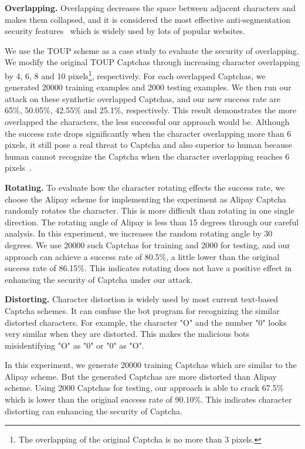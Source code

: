\textbf{Overlapping.} Overlapping decreases the space between adjacent characters and makes them collapsed, and it is considered the most effective anti-segmentation security features~\cite{Bursztein2011Text} which is widely used by lots of popular websites.

We use the TOUP scheme as a case study to evaluate the security of overlapping. We modify the original TOUP Captchas through increasing character overlapping by 4, 6, 8 and 10 pixels\footnote{The overlapping of the original Captcha is no more than 3 pixels.}, respectively. For each overlapped Captchas, we generated 20000 training examples and 2000 testing examples. We then run our attack on these synthetic overlapped Captchas, and our new success rate are 65\%, 50.05\%, 42.55\% and 25.1\%, respectively.  This result demonstrates the more overlapped the characters, the less successful our approach would be. Although the success rate drops significantly when the character overlapping more than 6 pixels, it still pose a real threat to Captcha and also superior to human because human cannot recognize the Captcha when the character overlapping reaches 6 pixels~\cite{Bursztein2014The}.

\textbf{Rotating.} To evaluate how the character rotating effects the success rate, we choose the Alipay scheme for implementing the experiment as Alipay Captcha randomly rotates the character. This is more difficult than rotating in one single direction. The rotating angle of Alipay is less than 15 degrees through our careful analysis. In this experiment, we increases the random rotating angle by 30 degrees. We use 20000 such Captchas for training and 2000 for testing, and our approach can achieve a success rate of 80.5\%, a little lower than the original success rate of 86.15\%. This indicates rotating does not have a positive effect in enhancing the security of Captcha under our attack. 

\textbf{Distorting.} Character distortion is widely used by most current text-based Captcha schemes. It can confuse the bot program for recognizing the similar distorted characters. For example, the character "O" and the number "0" looks very similar when they are distorted. This makes the malicious bots misidentifying "O" as "0" or "0" as "O". 

In this experiment, we generate 20000 training Captchas which are similar to the Alipay scheme. But the generated Captchas are more distorted than Alipay scheme. Using 2000 Captchas for testing, our approach is able to crack 67.5\% which is lower than the original success rate of 90.10\%. This indicates character distorting can enhancing the security of Captcha. 